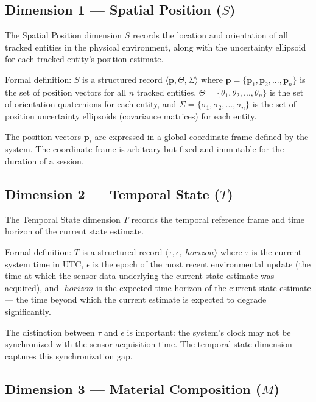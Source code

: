 \documentclass[12pt]{article}
\begin{document}
\subsection{Dimension 1 --- Spatial Position ($S$)}
\label{sec:spatial}

The Spatial Position dimension $S$ records the location and orientation of all tracked entities in the physical environment, along with the uncertainty ellipsoid for each tracked entity's position estimate.

Formal definition: $S$ is a structured record $\langle \mathbf{p}, \Theta, \Sigma \rangle$ where $\mathbf{p} = \{\mathbf{p}_1, \mathbf{p}_2, ..., \mathbf{p}_n\}$ is the set of position vectors for all $n$ tracked entities, $\Theta = \{\theta_1, \theta_2, ..., \theta_n\}$ is the set of orientation quaternions for each entity, and $\Sigma = \{\sigma_1, \sigma_2, ..., \sigma_n\}$ is the set of position uncertainty ellipsoids (covariance matrices) for each entity.

The position vectors $\mathbf{p}_i$ are expressed in a global coordinate frame defined by the system. The coordinate frame is arbitrary but fixed and immutable for the duration of a session.

\subsection{Dimension 2 --- Temporal State ($T$)}
\label{sec:temporal}

The Temporal State dimension $T$ records the temporal reference frame and time horizon of the current state estimate.

Formal definition: $T$ is a structured record $\langle \tau, \epsilon, \ horizon \rangle$ where $\tau$ is the current system time in UTC, $\epsilon$ is the epoch of the most recent environmental update (the time at which the sensor data underlying the current state estimate was acquired), and $\_horizon$ is the expected time horizon of the current state estimate --- the time beyond which the current estimate is expected to degrade significantly.

The distinction between $\tau$ and $\epsilon$ is important: the system's clock may not be synchronized with the sensor acquisition time. The temporal state dimension captures this synchronization gap.

\subsection{Dimension 3 --- Material Composition ($M$)}
\label{sec:material}
\end{document}
